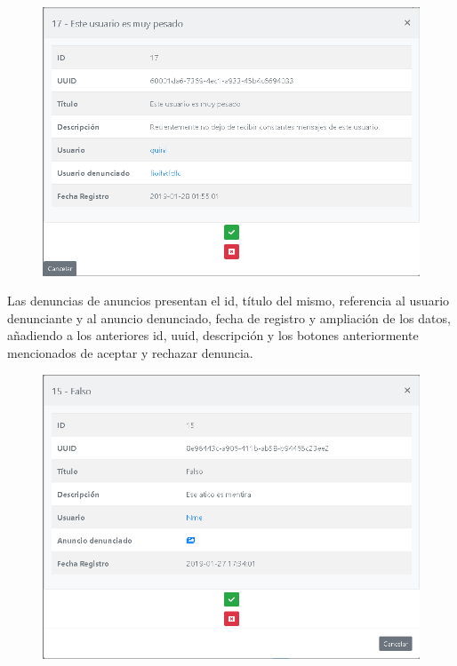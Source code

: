 \begin{figure}[h!]
\centering
\includegraphics[width=.7\textwidth]{Img/ManualUsuario/ADMIN_SHOW_REPORT_USER.png}
\end{figure}


Las denuncias de anuncios presentan el id, t\'{i}tulo del mismo, referencia al usuario denunciante y al anuncio denunciado, fecha de registro y ampliaci\'{o}n de los datos, a\~{n}adiendo a los anteriores id, uuid, descripci\'{o}n y los botones anteriormente mencionados de aceptar y rechazar denuncia.


\begin{figure}[h!]
\centering
\includegraphics[width=.7\textwidth]{Img/ManualUsuario/ADMIN_SHOW_REPORT_AD.png}
\end{figure}